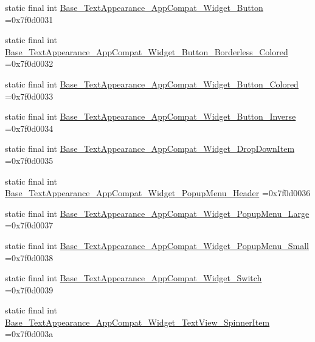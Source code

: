 \begin{DoxyCompactItemize}
\item 
static final int \mbox{\hyperlink{classcom_1_1example_1_1trainawearapplication_1_1_r_1_1style_ac4d2042b0183a166b14761171a7a8146}{Base\+\_\+\+Text\+Appearance\+\_\+\+App\+Compat\+\_\+\+Widget\+\_\+\+Button}} =0x7f0d0031
\item 
static final int \mbox{\hyperlink{classcom_1_1example_1_1trainawearapplication_1_1_r_1_1style_a0948c69bdebe27c500431a5d2dff3b30}{Base\+\_\+\+Text\+Appearance\+\_\+\+App\+Compat\+\_\+\+Widget\+\_\+\+Button\+\_\+\+Borderless\+\_\+\+Colored}} =0x7f0d0032
\item 
static final int \mbox{\hyperlink{classcom_1_1example_1_1trainawearapplication_1_1_r_1_1style_a492e8645494f98a11816436f861babb4}{Base\+\_\+\+Text\+Appearance\+\_\+\+App\+Compat\+\_\+\+Widget\+\_\+\+Button\+\_\+\+Colored}} =0x7f0d0033
\item 
static final int \mbox{\hyperlink{classcom_1_1example_1_1trainawearapplication_1_1_r_1_1style_aaf1abdea9db803fe00466bd8d185c7dc}{Base\+\_\+\+Text\+Appearance\+\_\+\+App\+Compat\+\_\+\+Widget\+\_\+\+Button\+\_\+\+Inverse}} =0x7f0d0034
\item 
static final int \mbox{\hyperlink{classcom_1_1example_1_1trainawearapplication_1_1_r_1_1style_a72cf2cc009653fa8685dc5a58abe62fb}{Base\+\_\+\+Text\+Appearance\+\_\+\+App\+Compat\+\_\+\+Widget\+\_\+\+Drop\+Down\+Item}} =0x7f0d0035
\item 
static final int \mbox{\hyperlink{classcom_1_1example_1_1trainawearapplication_1_1_r_1_1style_ab1661c08456c6f6f4bb3d5d3549c5824}{Base\+\_\+\+Text\+Appearance\+\_\+\+App\+Compat\+\_\+\+Widget\+\_\+\+Popup\+Menu\+\_\+\+Header}} =0x7f0d0036
\item 
static final int \mbox{\hyperlink{classcom_1_1example_1_1trainawearapplication_1_1_r_1_1style_a17e17da8a629692462a514b093b16087}{Base\+\_\+\+Text\+Appearance\+\_\+\+App\+Compat\+\_\+\+Widget\+\_\+\+Popup\+Menu\+\_\+\+Large}} =0x7f0d0037
\item 
static final int \mbox{\hyperlink{classcom_1_1example_1_1trainawearapplication_1_1_r_1_1style_a630ab2689e434baffca6a926921d010e}{Base\+\_\+\+Text\+Appearance\+\_\+\+App\+Compat\+\_\+\+Widget\+\_\+\+Popup\+Menu\+\_\+\+Small}} =0x7f0d0038
\item 
static final int \mbox{\hyperlink{classcom_1_1example_1_1trainawearapplication_1_1_r_1_1style_a436b98798ffea07960887594f9d29026}{Base\+\_\+\+Text\+Appearance\+\_\+\+App\+Compat\+\_\+\+Widget\+\_\+\+Switch}} =0x7f0d0039
\item 
static final int \mbox{\hyperlink{classcom_1_1example_1_1trainawearapplication_1_1_r_1_1style_aa583d43add174b2ec56c1b5032ba923d}{Base\+\_\+\+Text\+Appearance\+\_\+\+App\+Compat\+\_\+\+Widget\+\_\+\+Text\+View\+\_\+\+Spinner\+Item}} =0x7f0d003a

\end{DoxyCompactItemize}

